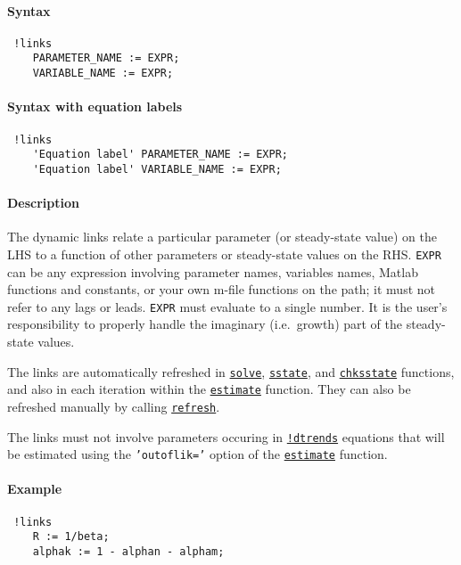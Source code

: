 


	\paragraph{Syntax}
 
 \begin{verbatim}
 !links
    PARAMETER_NAME := EXPR;
    VARIABLE_NAME := EXPR;
 \end{verbatim}
 
 \paragraph{Syntax with equation labels}
 
 \begin{verbatim}
 !links
    'Equation label' PARAMETER_NAME := EXPR;
    'Equation label' VARIABLE_NAME := EXPR;
 \end{verbatim}
 
 \paragraph{Description}
 
 The dynamic links relate a particular parameter (or steady-state value)
 on the LHS to a function of other parameters or steady-state values on
 the RHS. \texttt{EXPR} can be any expression involving parameter names,
 variables names, Matlab functions and constants, or your own m-file
 functions on the path; it must not refer to any lags or leads.
 \texttt{EXPR} must evaluate to a single number. It is the user's
 responsibility to properly handle the imaginary (i.e.~growth) part of
 the steady-state values.
 
 The links are automatically refreshed in
 \href{model/solve}{\texttt{solve}},
 \href{model/sstate}{\texttt{sstate}}, and
 \href{model/chksstate}{\texttt{chksstate}} functions, and also in each
 iteration within the \href{model/estimate}{\texttt{estimate}} function.
 They can also be refreshed manually by calling
 \href{model/refresh}{\texttt{refresh}}.
 
 The links must not involve parameters occuring in
 \href{modellang/dtrends}{\texttt{!dtrends}} equations that will be
 estimated using the \texttt{'outoflik='} option of the
 \href{model/estimate}{\texttt{estimate}} function.
 
 \paragraph{Example}
 
 \begin{verbatim}
 !links
    R := 1/beta;
    alphak := 1 - alphan - alpham;
 \end{verbatim}


